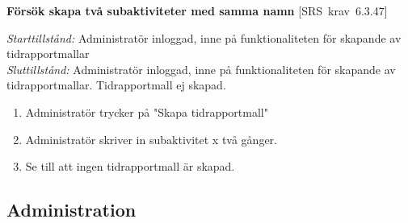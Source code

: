 \documentclass[a4paper]{article}
\def\reqinside{\hfil\penalty 100 \hfilneg \hbox}
\def \req [#1]{\reqinside{[SRS krav #1]}}
\begin{document}
\begin{FT}
\item
\textbf{Försök skapa två subaktiviteter med samma namn} \req[6.3.47]

\emph{Starttillstånd:} Administratör inloggad, inne på funktionaliteten för skapande av tidrapportmallar\\
\emph{Sluttillstånd:} Administratör inloggad, inne på funktionaliteten för skapande av tidrapportmallar. Tidrapportmall ej skapad.\\

\begin{enumerate}
\item Administratör trycker på "Skapa tidrapportmall"
\item Administratör skriver in subaktivitet x två gånger.
\item Se till att ingen tidrapportmall är skapad.
\end{enumerate}

\end{FT}






\subsection{Administration}
\end{document}

